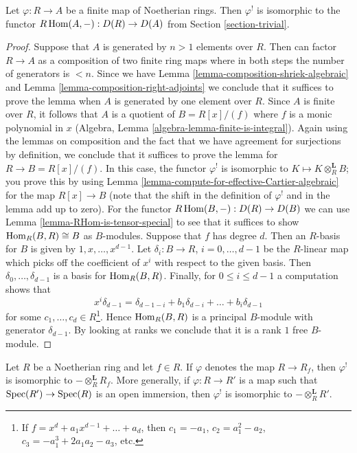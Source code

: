 \begin{lemma}
\label{lemma-upper-shriek-finite}
Let $\varphi : R \to A$ be a finite map of Noetherian rings.
Then $\varphi^!$ is isomorphic to the functor
$R\mathop{\mathrm{Hom}}\nolimits(A, -) : D(R) \to D(A)$ from
Section \ref{section-trivial}.
\end{lemma}

\begin{proof}
Suppose that $A$ is generated by $n > 1$ elements over $R$.
Then can factor $R \to A$ as a composition of two finite ring maps
where in both steps the number of generators is $< n$.
Since we have Lemma \ref{lemma-composition-shriek-algebraic} and
Lemma \ref{lemma-composition-right-adjoints}
we conclude that it suffices
to prove the lemma when $A$ is generated by one element over $R$.
Since $A$ is finite over $R$, it follows that $A$ is a quotient
of $B = R[x]/(f)$ where $f$ is a monic polynomial in $x$
(Algebra, Lemma \ref{algebra-lemma-finite-is-integral}).
Again using the lemmas on composition and the fact that we
have agreement for surjections by definition, we conclude that
it suffices to prove the lemma for $R \to B = R[x]/(f)$.
In this case, the functor $\varphi^!$ is isomorphic to
$K \mapsto K \otimes_R^\mathbf{L} B$; you prove this by
using Lemma \ref{lemma-compute-for-effective-Cartier-algebraic}
for the map $R[x] \to B$ (note that the shift in the definition
of $\varphi^!$ and in the lemma add up to zero).
For the functor $R\mathop{\mathrm{Hom}}\nolimits(B, -) : D(R) \to D(B)$ we can use
Lemma \ref{lemma-RHom-is-tensor-special}
to see that it suffices to show $\mathop{\mathrm{Hom}}\nolimits_R(B, R) \cong B$
as $B$-modules. Suppose that $f$ has degree $d$.
Then an $R$-basis for $B$ is given by $1, x, \ldots, x^{d - 1}$.
Let $\delta_i : B \to R$, $i = 0, \ldots, d - 1$
be the $R$-linear map which picks off the coefficient
of $x^i$ with respect to the given basis. Then
$\delta_0, \ldots, \delta_{d - 1}$ is a basis for $\mathop{\mathrm{Hom}}\nolimits_R(B, R)$.
Finally, for $0 \leq i \leq d - 1$ a computation shows that
$$
x^i \delta_{d - 1} =
\delta_{d - 1 - i} + b_1 \delta_{d - i} + \ldots + b_i \delta_{d - 1}
$$
for some $c_1, \ldots, c_d \in R$\footnote{If
$f = x^d + a_1 x^{d - 1} + \ldots + a_d$, then
$c_1 = -a_1$, $c_2 = a_1^2 - a_2$, $c_3 = -a_1^3 + 2a_1a_2 -a_3$, etc.}.
Hence $\mathop{\mathrm{Hom}}\nolimits_R(B, R)$ is a principal $B$-module with generator
$\delta_{d - 1}$. By looking
at ranks we conclude that it is a rank $1$ free $B$-module.
\end{proof}

\begin{lemma}
\label{lemma-upper-shriek-localize}
Let $R$ be a Noetherian ring and let $f \in R$.
If $\varphi$ denotes the map $R \to R_f$, then $\varphi^!$
is isomorphic to $- \otimes_R^\mathbf{L} R_f$.
More generally, if $\varphi : R \to R'$ is a map such that
$\mathop{\mathrm{Spec}}(R') \to \mathop{\mathrm{Spec}}(R)$ is an open immersion, then
$\varphi^!$ is isomorphic to $- \otimes_R^\mathbf{L} R'$.
\end{lemma}

